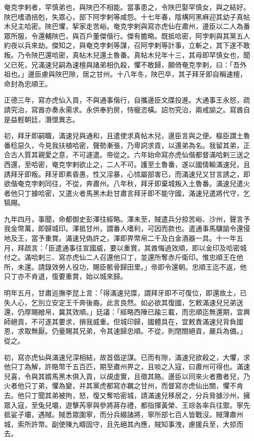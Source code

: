 \begin{pinyinscope}
奄克孛剌者，罕慎弟也，與陜巴不相能。當事患之，令陜巴娶罕慎女，與之結好。陜巴嗜酒掊剋，失眾心，部下阿孛剌等咸怨。十七年春，陰構阿黑麻迎其幼子真帖木兒主哈密。陜巴懼，挈家走苦峪。奄克孛剌與寫亦虎仙在肅州，邊臣以二人為番眾所服，令還輔陜巴，與百戶董傑偕行。傑有膽略。既抵哈密，阿孛剌與其黨五人約夜以兵來劫。傑知之，與奄克孛剌等謀，召阿孛剌等計事，立斬之，其下遂不敢叛。乃令陜巴還哈密，真帖木兒還土魯番。真帖木兒年十三，其母即罕慎女也，聞父已死，兄滿速兒嗣為速檀與諸弟相仇殺，懼不敢歸，願倚奄克孛剌，曰：「吾外祖也。」邊臣慮與陜巴隙，居之甘州。十八年冬，陜巴卒，其子拜牙即自稱速檀，命封為忠順王。

正德三年，寫亦虎仙入貢，不與通事偕行，自攜邊臣文牒投進。大通事王永怒，疏請究治，寫酋亦奏永需求。永供奉豹房，恃寵恣橫。詔勿究治，兩戒諭之。寫酋自是益輕朝廷，潛懷異志。

初，拜牙即嗣職，滿速兒與通和，且遣使求真帖木兒，邊臣言與之便。樞臣謂土魯番稔惡久，今見我扶植哈密，聲勢漸張，乃卑詞求貢，以還弟為名。我留其弟，正合古人質其親愛之意，不可遽遣。帝從之。六年始命寫亦虎仙偕都督滿哈剌三送之西還，至哈密，奄克孛剌欲止之，二人不可。護至土魯番，遂以國情輸滿速兒，且誘拜牙即叛。拜牙即素昏愚，性又淫暴，心怵屬部害已，而滿速兒又甘言誘之，即欲偕奄克孛剌同往，不從，奔肅州。八年秋，拜牙即棄城叛入土魯番。滿速兒遣火者他只丁據哈密，又遣火者馬黑木赴甘肅言拜牙即不能守國，滿速兒遣將代守，乞犒賜。

九年四月，事聞，命都御史彭澤往經略。澤未至，賊遣兵分掠苦峪、沙州，聲言予我金幣萬，即歸城印。澤抵甘州，謂番人嗜利，可因而款也。遣通事馬驥諭令還侵地及王，當予重賞。滿速兒偽許之，澤即畀幣帛二千及白金酒器一具。十一年五月，拜疏言：「臣遣通事往宣國威，要以重賞，其酋悔過效順，即以金印及哈密城付之。滿哈剌三、寫亦虎仙二人召還他只丁，並還所奪赤斤衛印。惟忠順王在他所，未還。請錄效勞人役功，賜臣骸骨歸田里。」帝即令還朝。忠順王迄不返，他只丁亦不肯退，復要重賞，始以城來歸。

明年五月，甘肅巡撫李昆上言：「得滿速兒牒，謂拜牙即不可復位，即還故土，已失人心，乞別立安定王千奔後裔。此言良然。如必欲其復國，乞敕滿速兒兄弟送還，仍厚賜繒帛，冀其效順。」廷議：「經略西陲已踰三載，而忠順迄無還期，宜興師絕貢，不可遂其要求，損我威重。但城印歸，國體具在，宜敕責滿速兒背負國恩，求取無厭。仍量賜其兄弟，令其速歸忠順。不從，則閉關絕貢，嚴兵為備。」從之。

初，寫亦虎仙與滿速兒深相結，故首倡逆謀。已而有隙，滿速兒欲殺之，大懼，求他只丁為解，許賂幣千五百匹，期至肅州畀之，且啖之入寇，曰肅州可得也。滿速兒喜，令與其婿馬黑木俱入貢，以覘虛實，且徵其賂。邊臣以同來火者撒者兒，乃火者他只丁弟，懼為變，并其黨虎都寫亦羈之甘州，而督寫亦虎仙出關，懼不肯去。他只丁聞其弟被拘，怒，復又奪哈密城，請滿速兒移居之，分兵脅據沙州，擁眾入寇，至兔兒壩，遊擊芮寧與參將蔣存禮，都指揮黃榮、王琮各率兵往禦。寧先抵娑子壩，遇賊。賊悉眾圍寧，而分兵綴諸將，寧所部七百人皆戰沒。賊薄肅州城，索所許幣。副使陳九疇固守，且先絕其內應，賊知事洩，慮援兵至，大掠而去。


\end{pinyinscope}
